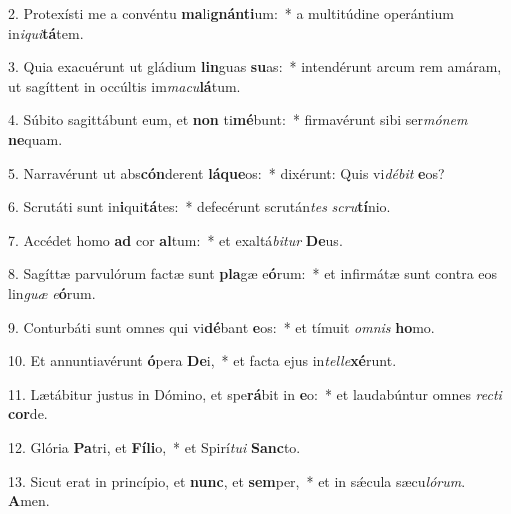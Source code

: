 2. Protexísti me a convéntu \textbf{ma}li\textbf{gnán}\textbf{ti}um:~*  a multitúdine operántium in\textit{i}\textit{qui}\textbf{tá}tem.\

3. Quia exacuérunt ut gládium \textbf{lin}guas \textbf{su}as:~*  intendérunt arcum rem amáram, ut sagíttent in occúltis im\textit{ma}\textit{cu}\textbf{lá}tum.\

4. Súbito sagittábunt eum, et \textbf{non} ti\textbf{mé}bunt:~*  firmavérunt sibi ser\textit{mó}\textit{nem} \textbf{ne}quam.\

5. Narravérunt ut abs\textbf{cón}derent \textbf{lá}\textbf{que}os:~*  dixérunt: Quis vi\textit{dé}\textit{bit} \textbf{e}os?\

6. Scrutáti sunt in\textbf{i}qui\textbf{tá}tes:~*  defecérunt scrután\textit{tes} \textit{scru}\textbf{tí}nio.\

7. Accédet homo \textbf{ad} cor \textbf{al}tum:~*  et exaltá\textit{bi}\textit{tur} \textbf{De}us.\

8. Sagíttæ parvulórum factæ sunt \textbf{pla}gæ e\textbf{ó}rum:~*  et infirmátæ sunt contra eos lin\textit{guæ} \textit{e}\textbf{ó}rum.\

9. Conturbáti sunt omnes qui vi\textbf{dé}bant \textbf{e}os:~*  et tímuit \textit{om}\textit{nis} \textbf{ho}mo.\

10. Et annuntiavérunt \textbf{ó}pera \textbf{De}i,~*  et facta ejus in\textit{tel}\textit{le}\textbf{xé}runt.\

11. Lætábitur justus in Dómino, et spe\textbf{rá}bit in \textbf{e}o:~*  et laudabúntur omnes \textit{rec}\textit{ti} \textbf{cor}de.\

12. Glória \textbf{Pa}tri, et \textbf{Fí}\textbf{li}o,~*  et Spirí\textit{tu}\textit{i} \textbf{Sanc}to.\

13. Sicut erat in princípio, et \textbf{nunc}, et \textbf{sem}per,~*  et in sǽcula sæcu\textit{ló}\textit{rum}. \textbf{A}men.\

